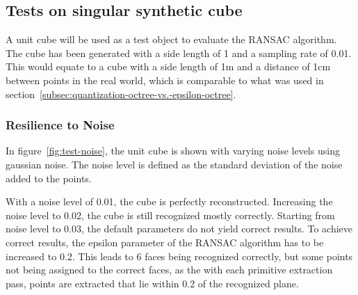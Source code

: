 \subsection{Tests on singular synthetic cube}\label{subsec:tests-on-singular-synthetic-cube}

A unit cube will be used as a test object to evaluate the RANSAC algorithm.
The cube has been generated with a side length of 1 and a sampling rate of 0.01.
This would equate to a cube with a side length of 1m and a distance of 1cm between points in the real world,
which is comparable to what was used in section~\ref{subsec:quantization-octree-vs.-epsilon-octree}.

\subsubsection{Resilience to Noise}
In figure~\ref{fig:test-noise}, the unit cube is shown with varying noise levels using gaussian noise.
The noise level is defined as the standard deviation of the noise added to the points.

With a noise level of 0.01, the cube is perfectly reconstructed.
Increasing the noise level to 0.02, the cube is still recognized mostly correctly.
Starting from noise level to 0.03, the default parameters do not yield correct results.
To achieve correct results, the epsilon parameter of the RANSAC algorithm has to be increased to 0.2.
This leads to 6 faces being recognized correctly, but some points not being assigned to the correct faces,
as the with each primitive extraction pass, points are extracted that lie within 0.2 of the recognized plane.


